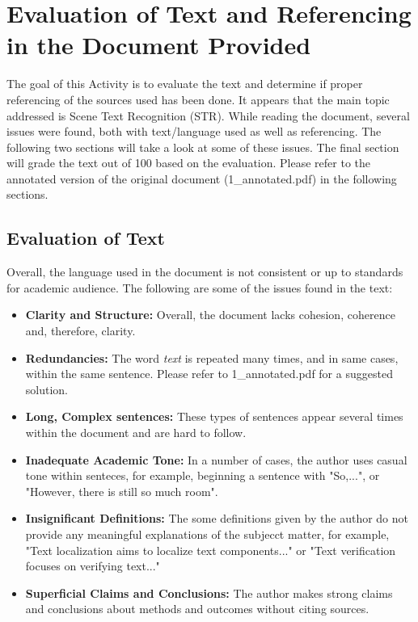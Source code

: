 \chapter*{Evaluation of Text and Referencing in the Document Provided}
\label{chap1}

The goal of this Activity is to evaluate the text and determine if proper referencing of the sources used has been done. It appears that the main topic addressed is Scene Text Recognition (STR). While reading the document, several issues were found, both with text/language used as well as referencing. The following two sections will take a look at some of these issues. The final section will grade the text out of 100 based on the evaluation. Please refer to the annotated version of the original document (1\_annotated.pdf) in the following sections.

\newpage

\section*{Evaluation of Text} 
Overall, the language used in the document is not consistent or up to standards for academic audience. The following are some of the issues found in the text:
\begin{itemize}
    \item \textbf{Clarity and Structure:} Overall, the document lacks cohesion, coherence and, therefore, clarity. 
    \item  \textbf{Redundancies:} The word \textit{text} is repeated many times, and in same cases, within the same sentence. Please refer to 1\_annotated.pdf for a suggested solution. 
    \item  \textbf{Long, Complex sentences:} These types of sentences appear several times within the document and are hard to follow. 
    \item  \textbf{Inadequate Academic Tone:} In a number of cases, the author uses casual tone within senteces, for example, beginning a sentence with "So,...", or "However, there is still so much room". 
\item  \textbf{Insignificant Definitions:} The some definitions given by the author
do not provide any meaningful explanations of the subjecct matter, for example, "Text localization aims to localize text components..." or "Text verification focuses on verifying text..."
\item  \textbf{Superficial Claims and Conclusions:} The author makes strong claims and conclusions about methods and outcomes without citing sources.

\end{itemize} 

